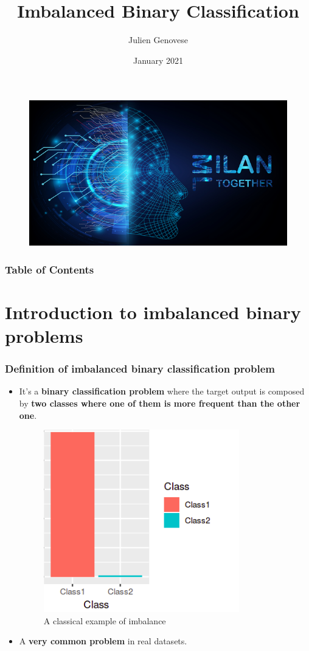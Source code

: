 \documentclass[9pt]{beamer}
\title{Imbalanced Binary Classification}
\author{Julien Genovese}
\institute{Machine Learning Together Milan}
\date{January 2021}
\begin{document}
\begin{frame}
\maketitle
\begin{figure}[ht]
\includegraphics[scale=0.25]{images/MLTM.jpeg}
\quad
\end{figure}
\end{frame}

\begin{frame}
\frametitle{Table of Contents}
\tableofcontents
\end{frame}
\section{Introduction to imbalanced binary problems}
\begin{frame}
\frametitle{Definition of imbalanced binary classification problem}
\begin{itemize}
\item It's a \textbf{binary classification problem} where the target output is composed by \textbf{two classes where one of them is more frequent than the other one}. 
\vspace{3mm}
\begin{figure}[ht]
\includegraphics[scale=0.50]{images/imbalance.png}
\caption{A classical example of imbalance}
\end{figure}
\item A \textbf{very common problem} in real datasets. 
\end{itemize}
\end{frame}
\end{document}
